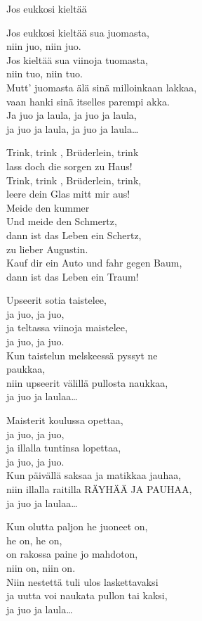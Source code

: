 \begin{song}{Jos eukkosi kieltää}

    Jos eukkosi kieltää sua juomasta,\\
    niin juo, niin juo.\\
    Jos kieltää sua viinoja tuomasta,\\
    niin tuo, niin tuo.\\
    Mutt’ juomasta älä sinä milloinkaan lakkaa,\\
    vaan hanki sinä itselles parempi akka.\\
    Ja juo ja laula, ja juo ja laula,\\
    ja juo ja laula, ja juo ja laula\dots

    Trink, trink , Brüderlein, trink\\
    lass doch die sorgen zu Haus!\\
    Trink, trink , Brüderlein, trink,\\
    leere dein Glas mitt mir aus!\\
    Meide den kummer\\
    Und meide den Schmertz,\\
    dann ist das Leben ein Schertz,\\
    zu lieber Augustin.\\
    Kauf dir ein Auto und fahr gegen Baum,\\
    dann ist das Leben ein Traum!

    Upseerit sotia taistelee,\\
    ja juo, ja juo,\\
    ja teltassa viinoja maistelee,\\
    ja juo, ja juo.\\
    Kun taistelun melskeessä pyssyt ne\\
    paukkaa,\\
    niin upseerit välillä pullosta naukkaa,\\
    ja juo ja laulaa\dots

    Maisterit koulussa opettaa,\\
    ja juo, ja juo,\\
    ja illalla tuntinsa lopettaa,\\
    ja juo, ja juo.\\
    Kun päivällä saksaa ja matikkaa jauhaa,\\
    niin illalla raitilla RÄYHÄÄ JA PAUHAA,\\
    ja juo ja laulaa\dots

    Kun olutta paljon he juoneet on,\\
    he on, he on,\\
    on rakossa paine jo mahdoton,\\
    niin on, niin on.\\
    Niin nestettä tuli ulos laskettavaksi\\
    ja uutta voi naukata pullon tai kaksi,\\
    ja juo ja laula\dots


\end{song}
